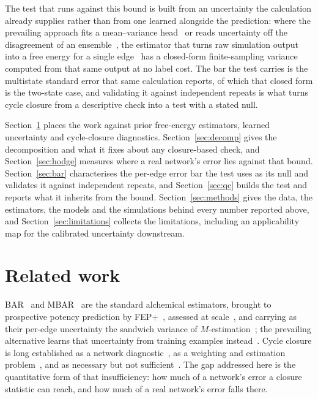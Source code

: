 The test that runs against this bound is built from an uncertainty the calculation already
supplies rather than from one learned alongside the prediction: where the prevailing approach fits
a mean--variance head~\citep{nix1994mve} or reads uncertainty off the disagreement of an
ensemble~\citep{lakshminarayanan2017ensembles}, the estimator that turns raw simulation output into
a free energy for a single edge~\citep{bennett1976bar} has a closed-form finite-sampling variance
computed from that same output at no label cost. The bar the test carries is the multistate
standard error that same calculation reports, of which that closed form is the two-state case, and
validating it against independent repeats is what turns cycle closure from a descriptive check
into a test with a stated null.

Section~\ref{sec:related} places the work against prior free-energy estimators, learned
uncertainty and cycle-closure diagnostics. Section~\ref{sec:decomp} gives the decomposition and
what it fixes about any closure-based check, and Section~\ref{sec:hodge} measures where a real
network's error lies against that bound. Section~\ref{sec:bar} characterises the per-edge error
bar the test uses as its null and validates it against independent repeats, and
Section~\ref{sec:qc} builds the test and reports what it inherits from the bound.
Section~\ref{sec:methods} gives the data, the estimators, the models and the simulations behind
every number reported above, and Section~\ref{sec:limitations} collects the limitations, including
an applicability map for the calibrated uncertainty downstream.

\section{Related work}\label{sec:related}
BAR~\citep{bennett1976bar} and MBAR~\citep{shirts2008mbar} are the standard alchemical estimators,
brought to prospective potency prediction by FEP+~\citep{wang2015fep}, assessed at
scale~\citep{schindler2020merck,mey2020alchem}, and carrying as their per-edge uncertainty the
sandwich variance of $M$-estimation~\citep{huber1967,white1982sandwich}; the prevailing alternative
learns that uncertainty from training examples
instead~\citep{nix1994mve,lakshminarayanan2017ensembles,kendall2017uncertainties,angelopoulos2021conformal}.
Cycle closure is long established as a network diagnostic~\citep{wang2015fep,cui2020hysteresis}, as
a weighting and estimation problem~\citep{li2023wcc,xu2019diffnet,giese2021variational}, and as
necessary but not sufficient~\citep{mey2020alchem}. The gap addressed here is the quantitative form
of that insufficiency: how much of a network's error a closure statistic can reach, and how much of
a real network's error falls there.

